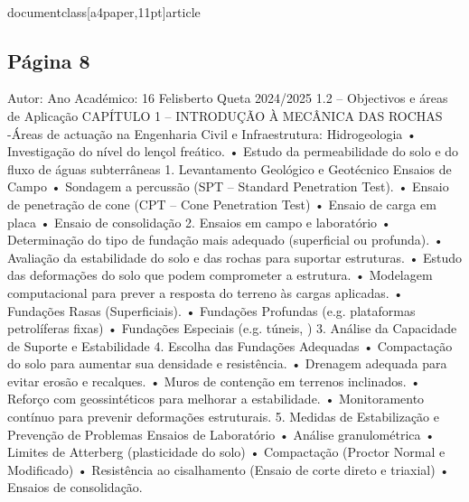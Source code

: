 \\documentclass[a4paper,11pt]{article}
\begin{document}
\subsection*{Página 8}
Autor:
Ano Académico:
16
Felisberto Queta
2024/2025
1.2 – Objectivos e áreas de Aplicação
CAPÍTULO 1 – INTRODUÇÃO À MECÂNICA DAS ROCHAS
-Áreas de actuação na Engenharia Civil e Infraestrutura:
Hidrogeologia
•
Investigação do nível do lençol freático.
•
Estudo da permeabilidade do solo e do fluxo de águas 
subterrâneas
1. Levantamento Geológico e Geotécnico
Ensaios de Campo
•
Sondagem a percussão (SPT – Standard Penetration Test).
•
Ensaio de penetração de cone (CPT – Cone Penetration
Test)
•
Ensaio de carga em placa
•
Ensaio de consolidação
2. Ensaios em campo e laboratório
•
Determinação do tipo de fundação mais adequado (superficial ou 
profunda).
•
Avaliação da estabilidade do solo e das rochas para suportar 
estruturas.
•
Estudo das deformações do solo que podem comprometer a 
estrutura.
•
Modelagem computacional para prever a resposta do terreno às 
cargas aplicadas.
•
Fundações Rasas (Superficiais).
•
Fundações Profundas (e.g. plataformas petrolíferas fixas)
•
Fundações Especiais (e.g. túneis, )
3. Análise da Capacidade de Suporte e Estabilidade
4. Escolha das Fundações Adequadas
•
Compactação do solo para aumentar sua densidade e 
resistência.
•
Drenagem adequada para evitar erosão e recalques.
•
Muros de contenção em terrenos inclinados.
•
Reforço com geossintéticos para melhorar a estabilidade.
•
Monitoramento contínuo para prevenir deformações estruturais.
5. Medidas de Estabilização e Prevenção de Problemas
Ensaios de Laboratório
•
Análise granulométrica
•
Limites de Atterberg (plasticidade do solo)
•
Compactação (Proctor Normal e Modificado)
•
Resistência ao cisalhamento (Ensaio de corte direto e 
triaxial)
•
Ensaios de consolidação.
\end{document}
